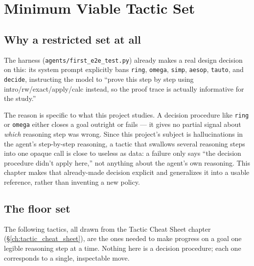 \chapter{Minimum Viable Tactic Set}
\label{ch:minimum_viable_tactics}

\section{Why a restricted set at all}

The harness (\texttt{agents/first\_e2e\_test.py}) already makes a real design decision on this: its system prompt explicitly bans \texttt{ring}, \texttt{omega}, \texttt{simp}, \texttt{aesop}, \texttt{tauto}, and \texttt{decide}, instructing the model to ``prove this step by step using intro/rw/exact/apply/calc instead, so the proof trace is actually informative for the study.''

The reason is specific to what this project studies. A decision procedure like \texttt{ring} or \texttt{omega} either closes a goal outright or fails --- it gives no partial signal about \emph{which} reasoning step was wrong. Since this project's subject is hallucinations in the agent's step-by-step reasoning, a tactic that swallows several reasoning steps into one opaque call is close to useless as data: a failure only says ``the decision procedure didn't apply here,'' not anything about the agent's own reasoning. This chapter makes that already-made decision explicit and generalizes it into a usable reference, rather than inventing a new policy.

\section{The floor set}

The following tactics, all drawn from the Tactic Cheat Sheet chapter (\hyperref[ch:tactic_cheat_sheet]{\S\ref*{ch:tactic_cheat_sheet}}), are the ones needed to make progress on a goal one legible reasoning step at a time. Nothing here is a decision procedure; each one corresponds to a single, inspectable move.

